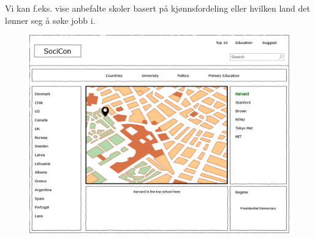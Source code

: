 Vi kan f.eks. vise anbefalte skoler basert på kjønnsfordeling eller hvilken land det lønner seg å søke jobb i.

\begin{figure}[H]
    \includegraphics[width=\textwidth]{images/milepael1/forsideBigdata.png}
\end{figure}
